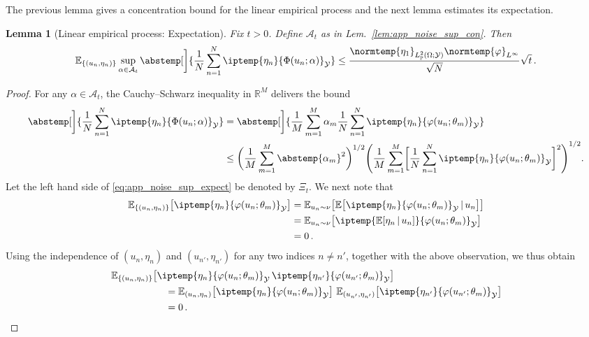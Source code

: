 \documentclass{article}
\theoremstyle{plain}
\newtheorem{lemma}[theorem]{Lemma}
\theoremstyle{my_def}
\theoremstyle{my_rem}
\numberwithin{equation}{section}
\numberwithin{theorem}{section}%
\newcommand{\R}{\mathbb{R}}
\newcommand{\E}{\mathbb{E}}
\renewcommand{\P}{\mathbb{P}}
\newcommand{\cA}{\mathcal{A}}
\newcommand{\cY}{\mathcal{Y}}
\let\originalleft\left %
\let\originalright\right
\renewcommand{\left}{\mathopen{}\mathclose\bgroup\originalleft}
\renewcommand{\right}{\aftergroup\egroup\originalright}
\newcommand{\ip}{\iptemp}
\newcommand{\norm}{\normtemp}
\newcommand{\abs}{\abstemp}
\newcommand{\condbar}{\, \vert \,}
\renewcommand{\E}{\operatorname{\mathbb{E}}} %
\renewcommand{\phi}{\varphi}
\begin{document}
The previous lemma gives a concentration bound for the linear empirical process and the next lemma estimates its expectation.
\begin{lemma}[Linear empirical process: Expectation]\label{lem:app_noise_sup_expect}
    Fix $t>0$. Define $\cA_t$ as in Lem.~\ref{lem:app_noise_sup_con}. Then
    \begin{equation}\label{eq:app_noise_sup_expect}
        \E_{\{(u_n,\eta_n)\}} \sup_{\alpha\in\cA_t}\abs[\bigg]{\frac{1}{N}\sum_{n=1}^N\ip{\eta_n}{\Phi(u_n;\alpha)}_{\cY}} \leq \frac{\norm{\eta_1}_{L^2_\P(\Omega;\cY)}\norm{\phi}_{L^\infty}}{\sqrt{N}}\sqrt{t}\,.
    \end{equation}
\end{lemma}
\begin{proof}
    For any $\alpha\in\cA_t$, the Cauchy--Schwarz inequality in $\R^M$ delivers the bound
    \begin{align*}
        \abs[\bigg]{\frac{1}{N}\sum_{n=1}^N\ip{\eta_n}{\Phi(u_n;\alpha)}_{\cY}}&=\abs[\bigg]{\frac{1}{M}\sum_{m=1}^M\alpha_m\frac{1}{N}\sum_{n=1}^N\ip{\eta_n}{\phi(u_n;\theta_m)}_{\cY}}\\
        &\leq \biggl(\frac{1}{M}\sum_{m=1}^M\abs{\alpha_m}^2\biggr)^{1/2}
        \left(\frac{1}{M}\sum_{m=1}^M\biggl[\frac{1}{N}\sum_{n=1}^N\ip{\eta_n}{\phi(u_n;\theta_m)}_{\cY}\biggr]^2\right)^{1/2}.
    \end{align*}
    Let the left hand side of \eqref{eq:app_noise_sup_expect} be denoted by $\Xi_t$. We next note that
    \begin{align*}
    \E_{\{(u_n,\eta_n)\}}\bigl[\ip{\eta_n}{\phi(u_n;\theta_m)}_{\cY}\bigr]
    &=
    \E_{u_n\sim \nu}\left[
    \E\bigl[\ip{\eta_n}{\phi(u_n;\theta_m)}_{\cY} \condbar u_n\bigr]
    \right]
    \\
    &= 
    \E_{u_n\sim \nu}\left[
    \ip{\E[\eta_n\condbar  u_n]}{\phi(u_n;\theta_m)}_{\cY} 
    \right]
    \\
    &=0\,.
    \end{align*}
    Using the independence of $(u_n,\eta_n)$ and $(u_{n'},\eta_{n'})$ for any two indices $n\ne n'$, together with the above observation, we thus obtain
    \begin{align*}
    &\E_{\{(u_n,\eta_n)\}}\bigl[\ip{\eta_n}{\phi(u_n;\theta_m)}_{\cY}\,\ip{\eta_{n'}}{\phi(u_{n'};\theta_m)}_{\cY}\bigr]
    \\
   & \hspace{2cm} = 
    \E_{(u_{n},\eta_{n})} \bigl[\ip{\eta_n}{\phi(u_n;\theta_m)}_{\cY}\bigr]\,\E_{(u_{n'},\eta_{n'})}\bigl[\ip{\eta_{n'}}{\phi(u_{n'};\theta_m)}_{\cY}\bigr]
    \\
    &\hspace{2cm} = 
    0\,.
    \end{align*}
    

\end{proof}
\end{document}
